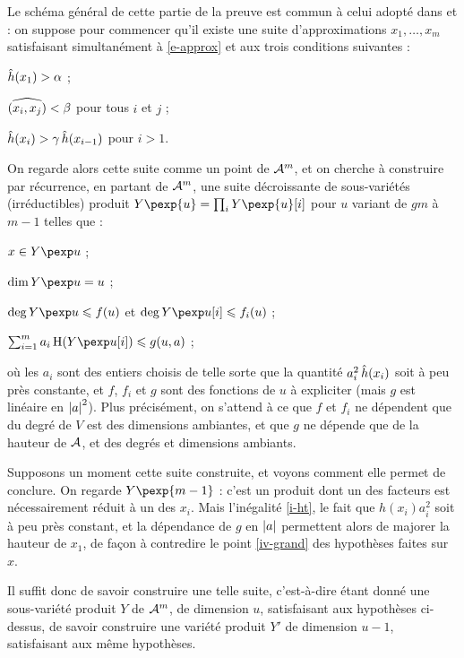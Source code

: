Le schéma général de cette partie de la preuve est commun à celui adopté dans
\cite{remivds} et \cite{falda} : on suppose pour commencer qu'il existe une
suite d'approximations $x_1, \ldots, x_m$ satisfaisant simultanément à
\eqref{e-approx} et aux trois conditions suivantes :
\begin{enumthm}
  \item $\mathop{\smash{\hat h}}(x_1) > \alpha$ ; \label{iv-grand}
  \item $\widehat{(x_i,x_j)} < \beta$ pour tous $i$ et $j$ ; \label{iv-angle}
  \item $\mathop{\smash{\hat h}}(x_i) > \gamma \mathop{\smash{\hat h}}(x_{i-1})$ pour $i > 1$. \label{iv-ecart}
\end{enumthm}
On regarde alors cette suite comme un point de $\mathcal A^m$, et on cherche à
construire par récurrence, en partant de $\mathcal A^m$,  une suite
décroissante de sous-variétés (irréductibles) produit $Y\pexp{u} =
\prod_i Y\pexp{u}[i]$ pour $u$ variant de $gm$ à $m-1$ telles que :
\begin{enumthm}
  \item $x \in Y\pexp u$ ;
  \item $\dim Y\pexp u = u$ ;
  \item $\deg Y\pexp u \le f(u)$ et $\deg Y\pexp u[i] \le f_i(u)$ ;
  \item $\sum_{i=1}^m a_i \haut{Y\pexp u[i]} \le g(u, a)$ ; \label{i-ht}
\end{enumthm}
où les $a_i$ sont des entiers choisis de telle sorte que la quantité $a_i^2
\mathop{\smash{\hat h}}(x_i)$ soit à peu près constante, et $f$, $f_i$ et $g$ sont des
fonctions de $u$ à expliciter (mais $g$ est linéaire en $\left\lvert a\right\rvert^2$). Plus
précisément, on s'attend à ce que $f$ et $f_i$ ne dépendent que du degré de
$V$ est des dimensions ambiantes, et que $g$ ne dépende que de la hauteur de
$\mathcal A$, et des degrés et dimensions ambiants.

Supposons un moment cette suite construite, et voyons comment elle permet de
conclure. On regarde $Y\pexp{m-1}$ : c'est un produit dont un des facteurs est
nécessairement réduit à un des $x_i$. Mais l'inégalité \ref{i-ht}, le fait que
$h(x_i)a_i^2$ soit à peu près constant, et la dépendance de $g$ en $\left\lvert a\right\rvert$
permettent alors de majorer la hauteur de $x_1$, de façon à contredire le
point \ref{iv-grand} des hypothèses faites sur $x$.

Il suffit donc de savoir construire une telle suite, c'est-à-dire étant donné
une sous-variété produit $Y$ de $\mathcal A^m$, de dimension $u$, satisfaisant aux
hypothèses ci-dessus, de savoir construire une variété produit $Y'$ de
dimension $u-1$, satisfaisant aux même hypothèses.

